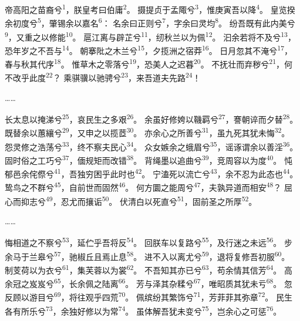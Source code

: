 
\begin{poem}
帝高阳之苗裔兮\textsuperscript{1}，朕皇考曰伯庸\textsuperscript{2}。
摄提贞于孟陬兮\textsuperscript{3}，惟庚寅吾以降\textsuperscript{4}。
皇览揆余初度兮\textsuperscript{5}，肇锡余以嘉名\textsuperscript{6}：
名余曰正则兮\textsuperscript{7}，字余曰灵均\textsuperscript{8}。
纷吾既有此内美兮\textsuperscript{9}，又重之以修能\textsuperscript{10}。
扈江离与辟芷兮\textsuperscript{11}，纫秋兰以为佩\textsuperscript{12}。
汩余若将不及兮\textsuperscript{13}，恐年岁之不吾与\textsuperscript{14}。
朝搴阰之木兰兮\textsuperscript{15}，夕揽洲之宿莽\textsuperscript{16}。
日月忽其不淹兮\textsuperscript{17}，春与秋其代序\textsuperscript{18}。
惟草木之零落兮\textsuperscript{19}，恐美人之迟暮\textsuperscript{20}。
不抚壮而弃秽兮\textsuperscript{21}，何不改乎此度\textsuperscript{22}？
乘骐骥以驰骋兮\textsuperscript{23}，来吾道夫先路\textsuperscript{24}！

……

长太息以掩涕兮\textsuperscript{25}，哀民生之多艰\textsuperscript{26}。
余虽好修姱以鞿羁兮\textsuperscript{27}，謇朝谇而夕替\textsuperscript{28}。
既替余以蕙纕兮\textsuperscript{29}，又申之以揽茝\textsuperscript{30}。
亦余心之所善兮\textsuperscript{31}，虽九死其犹未悔\textsuperscript{32}。
怨灵修之浩荡兮\textsuperscript{33}，终不察夫民心\textsuperscript{34}。
众女嫉余之蛾眉兮\textsuperscript{35}，谣诼谓余以善淫\textsuperscript{36}。
固时俗之工巧兮\textsuperscript{37}，偭规矩而改错\textsuperscript{38}。
背绳墨以追曲兮\textsuperscript{39}，竞周容以为度\textsuperscript{40}。
忳郁邑余侘傺兮\textsuperscript{41}，吾独穷困乎此时也\textsuperscript{42}。
宁溘死以流亡兮\textsuperscript{43}，余不忍为此态也\textsuperscript{44}。
鸷鸟之不群兮\textsuperscript{45}，自前世而固然\textsuperscript{46}。
何方圜之能周兮\textsuperscript{47}，夫孰异道而相安\textsuperscript{48}？
屈心而抑志兮\textsuperscript{49}，忍尤而攘诟\textsuperscript{50}。
伏清白以死直兮\textsuperscript{51}，固前圣之所厚\textsuperscript{52}。

……

悔相道之不察兮\textsuperscript{53}，延伫乎吾将反\textsuperscript{54}。
回朕车以复路兮\textsuperscript{55}，及行迷之未远\textsuperscript{56}。
步余马于兰皋兮\textsuperscript{57}，驰椒丘且焉止息\textsuperscript{58}。
进不入以离尤兮\textsuperscript{59}，退将复修吾初服\textsuperscript{60}。
制芰荷以为衣兮\textsuperscript{61}，集芙蓉以为裳\textsuperscript{62}。
不吾知其亦已兮\textsuperscript{63}，苟余情其信芳\textsuperscript{64}。
高余冠之岌岌兮\textsuperscript{65}，长余佩之陆离\textsuperscript{66}。
芳与泽其杂糅兮\textsuperscript{67}，唯昭质其犹未亏\textsuperscript{68}。
忽反顾以游目兮\textsuperscript{69}，将往观乎四荒\textsuperscript{70}。
佩缤纷其繁饰兮\textsuperscript{71}，芳菲菲其弥章\textsuperscript{72}。
民生各有所乐兮\textsuperscript{73}，余独好修以为常\textsuperscript{74}。
虽体解吾犹未变兮\textsuperscript{75}，岂余心之可惩\textsuperscript{76}。
\end{poem}

